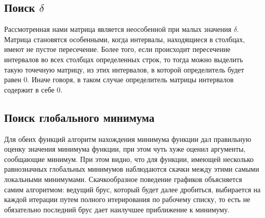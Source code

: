 \subsection{Поиск $\delta$}

Рассмотренная нами матрица является неособенной при малых значения $\delta$. Матрица становятся особенными, когда интервалы, находящиеся в столбцах, имеют не пустое пересечение. Более того, если происходит пересечение интервалов во всех столбцах определенных строк, то тогда можно выделить такую точечную матрицу, из этих интервалов, в которой определитель будет равен 0. Иначе говоря, в таком случае определитель матрицы интервалов содержит в себе 0.

\subsection{Поиск глобального минимума}

Для обеих функций алгоритм нахождения минимума функции дал правильную оценку значения минимума функции, при этом чуть хуже оценил аргументы, сообщающие минимум. При этом видно, что для функции, имеющей несколько равнозначных глобальных минимумов наблюдаются скачки между этими самыми локальными минимумами. Скачкообразное поведение графиков объясняется самим алгоритмом: ведущий брус, который будет далее дробиться, выбирается на каждой итерации путем полного итерирования по рабочему списку, то есть не обязательно последний брус дает наилучшее приближение к минимуму.